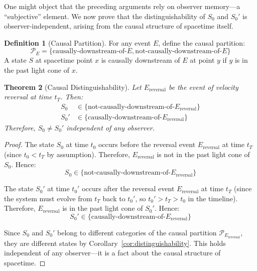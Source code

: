 \documentclass[twocolumn,10pt]{article}
\newtheorem{theorem}{Theorem}[section]
\theoremstyle{definition}
\newtheorem{definition}[theorem]{Definition}
\theoremstyle{remark}
\begin{document}
One might object that the preceding arguments rely on observer memory—a ``subjective'' element. We now prove that the distinguishability of $S_0$ and $S_0'$ is observer-independent, arising from the causal structure of spacetime itself.

\begin{definition}[Causal Partition]
For any event $E$, define the causal partition:
\begin{equation}
\mathcal{P}_E = \{\text{causally-downstream-of-}E, \text{not-causally-downstream-of-}E\}
\end{equation}
A state $S$ at spacetime point $x$ is causally downstream of $E$ at point $y$ if $y$ is in the past light cone of $x$.
\end{definition}

\begin{theorem}[Causal Distinguishability]
\label{thm:causal_distinguishability}
Let $E_{\text{reversal}}$ be the event of velocity reversal at time $t_T$. Then:
\begin{align}
S_0 &\in \{\text{not-causally-downstream-of-}E_{\text{reversal}}\} \\
S_0' &\in \{\text{causally-downstream-of-}E_{\text{reversal}}\}
\end{align}
Therefore, $S_0 \neq S_0'$ independent of any observer.
\end{theorem}

\begin{proof}
The state $S_0$ at time $t_0$ occurs before the reversal event $E_{\text{reversal}}$ at time $t_T$ (since $t_0 < t_T$ by assumption). Therefore, $E_{\text{reversal}}$ is not in the past light cone of $S_0$. Hence:
\begin{equation}
S_0 \in \{\text{not-causally-downstream-of-}E_{\text{reversal}}\}
\end{equation}

The state $S_0'$ at time $t_0'$ occurs after the reversal event $E_{\text{reversal}}$ at time $t_T$ (since the system must evolve from $t_T$ back to $t_0'$, so $t_0' > t_T > t_0$ in the timeline). Therefore, $E_{\text{reversal}}$ is in the past light cone of $S_0'$. Hence:
\begin{equation}
S_0' \in \{\text{causally-downstream-of-}E_{\text{reversal}}\}
\end{equation}

Since $S_0$ and $S_0'$ belong to different categories of the causal partition $\mathcal{P}_{E_{\text{reversal}}}$, they are different states by Corollary~\ref{cor:distinguishability}. This holds independent of any observer—it is a fact about the causal structure of spacetime.
\end{proof}
\end{document}
